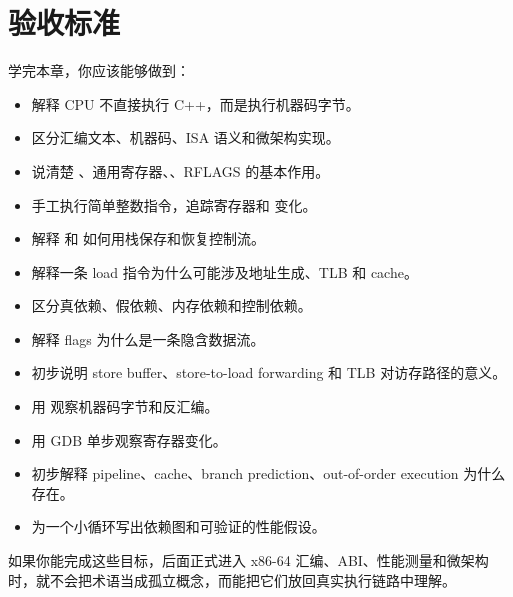 \section{验收标准}

学完本章，你应该能够做到：

\begin{itemize}
  \item 解释 CPU 不直接执行 C++，而是执行机器码字节。
  \item 区分汇编文本、机器码、ISA 语义和微架构实现。
  \item 说清楚 、通用寄存器、、RFLAGS 的基本作用。
  \item 手工执行简单整数指令，追踪寄存器和  变化。
  \item 解释  和  如何用栈保存和恢复控制流。
  \item 解释一条 load 指令为什么可能涉及地址生成、TLB 和 cache。
  \item 区分真依赖、假依赖、内存依赖和控制依赖。
  \item 解释 flags 为什么是一条隐含数据流。
  \item 初步说明 store buffer、store-to-load forwarding 和 TLB 对访存路径的意义。
  \item 用  观察机器码字节和反汇编。
  \item 用 GDB 单步观察寄存器变化。
  \item 初步解释 pipeline、cache、branch prediction、out-of-order execution 为什么存在。
  \item 为一个小循环写出依赖图和可验证的性能假设。
\end{itemize}

如果你能完成这些目标，后面正式进入 x86-64 汇编、ABI、性能测量和微架构时，就不会把术语当成孤立概念，而能把它们放回真实执行链路中理解。
